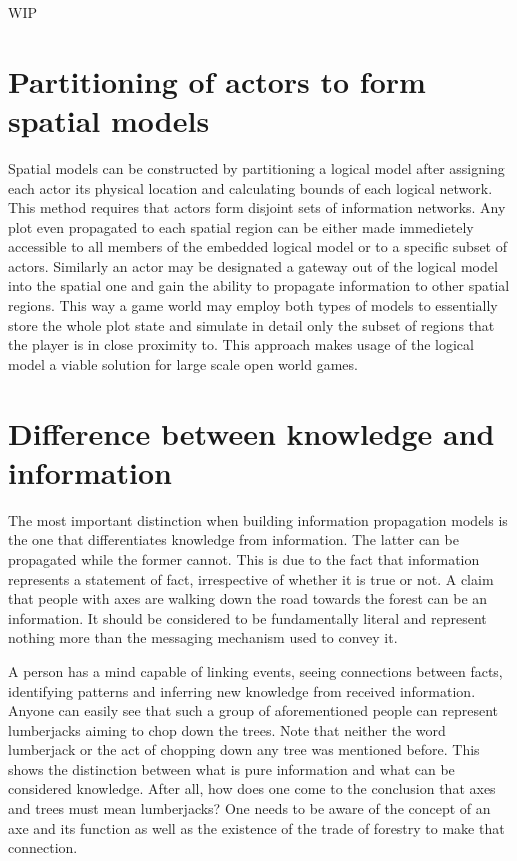WIP

\section{Partitioning of actors to form spatial models}

Spatial models can be constructed by partitioning a logical model after assigning each actor its physical location and calculating bounds of each logical network.
This method requires that actors form disjoint sets of information networks.
Any plot even propagated to each spatial region can be either made immedietely accessible to all members of the embedded logical model or to a specific subset of actors.
Similarly an actor may be designated a gateway out of the logical model into the spatial one and gain the ability to propagate information to other spatial regions.
This way a game world may employ both types of models to essentially store the whole plot state and simulate in detail only the subset of regions that the player is in close proximity to.
This approach makes usage of the logical model a viable solution for large scale open world games.

\section{Difference between knowledge and information}

The most important distinction when building information propagation models is the one that differentiates knowledge from information.
The latter can be propagated while the former cannot.
This is due to the fact that information represents a statement of fact, irrespective of whether it is true or not.
A claim that people with axes are walking down the road towards the forest can be an information.
It should be considered to be fundamentally literal and represent nothing more than the messaging mechanism used to convey it.

A person has a mind capable of linking events, seeing connections between facts, identifying patterns and inferring new knowledge from received information.
Anyone can easily see that such a group of aforementioned people can represent lumberjacks aiming to chop down the trees.
Note that neither the word lumberjack or the act of chopping down any tree was mentioned before.
This shows the distinction between what is pure information and what can be considered knowledge.
After all, how does one come to the conclusion that axes and trees must mean lumberjacks?
One needs to be aware of the concept of an axe and its function as well as the existence of the trade of forestry to make that connection.

